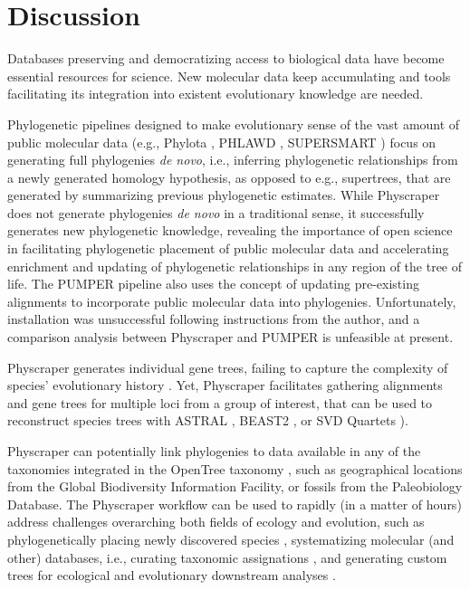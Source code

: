 \documentclass{bmcart}
\begin{document}
\section*{Discussion}

Databases preserving and democratizing access to biological data
have become essential resources for science.
New molecular data keep accumulating and tools facilitating its integration into
existent evolutionary knowledge are needed.

Phylogenetic pipelines designed to make evolutionary sense of the vast amount of
public molecular data (e.g., Phylota \cite{sanderson2008phylota},
PHLAWD \cite{smith2009mega},
SUPERSMART \cite{antonelli2017toward}) focus on generating full phylogenies \textit{de novo},
i.e., inferring phylogenetic relationships from a newly generated homology hypothesis,
as opposed to e.g., supertrees, that are generated by summarizing previous
phylogenetic estimates.
While Physcraper does not generate phylogenies \textit{de novo} in a traditional sense,
it successfully generates new phylogenetic knowledge, revealing the importance of
open science in facilitating phylogenetic placement of public molecular data and
accelerating enrichment and updating of phylogenetic relationships in any region
of the tree of life.
The PUMPER pipeline \cite{izquierdo2014pumper} also uses the concept of updating
pre-existing alignments to incorporate public molecular data into phylogenies.
Unfortunately, installation was unsuccessful following instructions from the author,
and a comparison analysis between Physcraper and PUMPER is unfeasible at present.

Physcraper generates individual gene trees, failing to capture the complexity of
species' evolutionary history \cite{song2012resolving}. Yet, Physcraper facilitates
gathering alignments and gene trees for multiple loci from a group of interest,
that can be used to reconstruct species trees with ASTRAL \cite{mirarab2014astral},
BEAST2 \cite{bouckaert2019beast}, or SVD Quartets \cite{chifman2014quartet}).

Physcraper can potentially link phylogenies to data available in any of the
taxonomies integrated in the OpenTree taxonomy \cite{rees2017automated}, such as
geographical locations from the Global Biodiversity Information Facility, or
fossils from the Paleobiology Database.
The Physcraper workflow can be used to rapidly (in a matter of hours)
address challenges overarching both fields of ecology and evolution, such as
phylogenetically placing newly discovered species \cite{webb2010biodiversity},
systematizing molecular (and other) databases, i.e., curating taxonomic assignations
\cite{san2010molecular},
and generating custom trees for ecological \cite{helmus2012phylogenetic} and
evolutionary downstream analyses \cite{stoltzfus2013phylotastic}.
\end{document}
